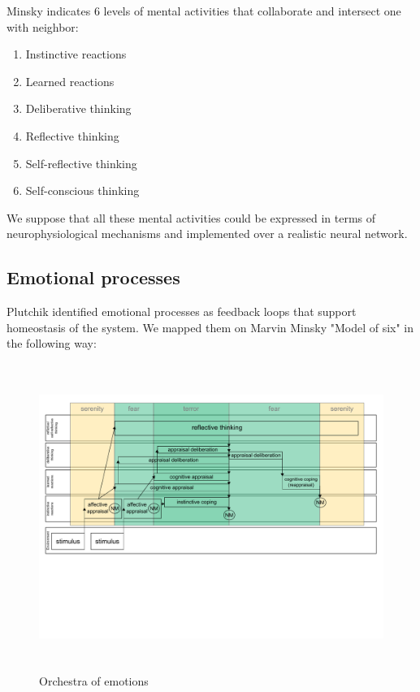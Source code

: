 Minsky indicates 6 levels of mental activities that collaborate and intersect one with neighbor:

\begin{enumerate}
 \item  Instinctive reactions
 \item  Learned reactions
 \item  Deliberative thinking
 \item  Reflective thinking
 \item  Self-reflective thinking
 \item  Self-conscious thinking
\end{enumerate}

We suppose that all these mental activities could be expressed in terms of neurophysiological mechanisms and implemented over a realistic neural network.

\subsection{Emotional processes}

Plutchik identified emotional processes as feedback loops \cite{natureofemotions} that support homeostasis of the system. We mapped them on Marvin Minsky "Model of six" in the following way:

\begin{figure}
\begin{center}
 \includegraphics[height=10cm, angle=90]{figure2_orchestra_of_emotions}
\end{center}
\caption{Orchestra of emotions}
\label{figure2_orchestra_of_emotions}
\end{figure}


